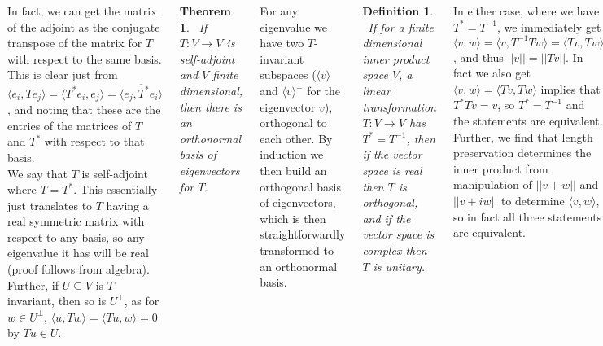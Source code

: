 \documentclass{tikzposter} %
\newtheorem{theorem}{Theorem}
\newtheorem{definition}{Definition}
\begin{document}
\begin{columns}
{       In fact, we can get the matrix of the adjoint as the conjugate transpose of the matrix for $T$ with respect to the same basis. This is clear just from $\langle e_{i}, Te_{j} \rangle = \langle T^{*}e_{i}, e_{j} \rangle = \overline{\langle e_{j}, T^{*}e_{i} \rangle}$, and noting that these are the entries of the matrices of $T$ and $T^{*}$ with respect to that basis. \\

       We say that $T$ is self-adjoint where $T = T^{*}$. This essentially just translates to $T$ having a real symmetric matrix with respect to any basis, so any eigenvalue it has will be real (proof follows from algebra). Further, if $U \subseteq V$ is $T$-invariant, then so is $U^{\bot}$, as for $w \in U^{\bot}$, $\langle u, Tw \rangle = \langle Tu, w \rangle = 0$ by $Tu \in U$. \\


       \begin{theorem}
       \ If $T : V \to V$ is self-adjoint and $V$ finite dimensional, then there is an orthonormal basis of eigenvectors for $T$.
       \end{theorem}
       \hphantom{}

       For any eigenvalue we have two $T$-invariant subspaces ($\langle v \rangle$ and $\langle v \rangle^{\bot}$ for the eigenvector $v$), orthogonal to each other. By induction we then build an orthogonal basis of eigenvectors, which is then straightforwardly transformed to an orthonormal basis. \\

       \begin{definition}
       \ If for a finite dimensional inner product space $V$, a linear transformation $T : V \to V$ has $T^{*} = T^{-1}$, then if the vector space is real then $T$ is orthogonal, and if the vector space is complex then $T$ is unitary.
       \end{definition}
       \hphantom{}

       In either case, where we have $T^{*} = T^{-1}$, we immediately get $\langle v, w \rangle = \langle v, T^{-1}Tw \rangle = \langle Tv, Tw \rangle $, and thus $||v|| = ||Tv||$. In fact we also get $\langle v, w \rangle = \langle Tv, Tw \rangle$ implies that $T^{*}Tv = v$, so $T^{*} = T^{-1}$ and the statements are equivalent. Further, we find that length preservation determines the inner product from manipulation of $||v+w||$ and $||v+iw||$ to determine $\langle v, w \rangle$, so in fact all three statements are equivalent.\\

}
\end{columns}
\end{document}
